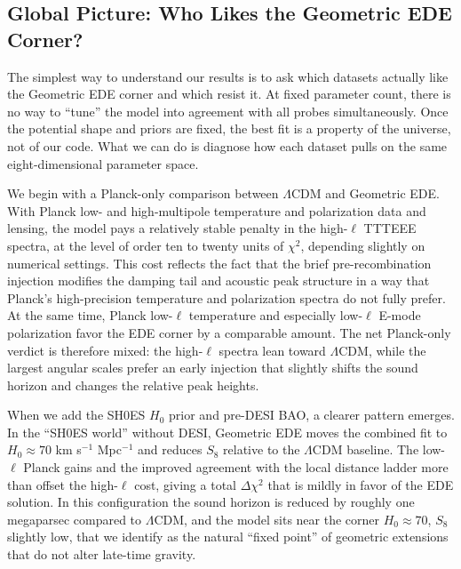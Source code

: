 \documentclass[a4paper,11pt]{article}
\begin{document}
\subsection*{Global Picture: Who Likes the Geometric EDE Corner?}

The simplest way to understand our results is to ask which datasets actually like the Geometric EDE corner and which resist it. At fixed parameter count, there is no way to ``tune'' the model into agreement with all probes simultaneously. Once the potential shape and priors are fixed, the best fit is a property of the universe, not of our code. What we can do is diagnose how each dataset pulls on the same eight-dimensional parameter space.

We begin with a Planck-only comparison between $\Lambda$CDM and Geometric EDE. With Planck low- and high-multipole temperature and polarization data and lensing, the model pays a relatively stable penalty in the high-$\ell$ TTTEEE spectra, at the level of order ten to twenty units of $\chi^2$, depending slightly on numerical settings. This cost reflects the fact that the brief pre-recombination injection modifies the damping tail and acoustic peak structure in a way that Planck's high-precision temperature and polarization spectra do not fully prefer. At the same time, Planck low-$\ell$ temperature and especially low-$\ell$ E-mode polarization favor the EDE corner by a comparable amount. The net Planck-only verdict is therefore mixed: the high-$\ell$ spectra lean toward $\Lambda$CDM, while the largest angular scales prefer an early injection that slightly shifts the sound horizon and changes the relative peak heights.

When we add the SH0ES $H_0$ prior and pre-DESI BAO, a clearer pattern emerges. In the ``SH0ES world'' without DESI, Geometric EDE moves the combined fit to $H_0 \approx 70$ km s$^{-1}$ Mpc$^{-1}$ and reduces $S_8$ relative to the $\Lambda$CDM baseline. The low-$\ell$ Planck gains and the improved agreement with the local distance ladder more than offset the high-$\ell$ cost, giving a total $\Delta\chi^2$ that is mildly in favor of the EDE solution. In this configuration the sound horizon is reduced by roughly one megaparsec compared to $\Lambda$CDM, and the model sits near the corner $H_0 \approx 70$, $S_8$ slightly low, that we identify as the natural ``fixed point'' of geometric extensions that do not alter late-time gravity.
\end{document}
